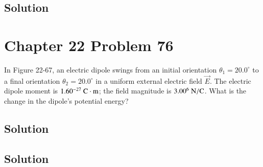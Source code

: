 \documentclass{article}
\newcommand{\m}{\text{m}}
\newcommand{\N}{\text{N}}
\newcommand{\C}{\text{C}}
\begin{document}
\subsection*{Solution}


\section*{Chapter 22 Problem 76}
In Figure 22-67, an electric dipole swings from an initial orientation $\theta_1 = 20.0^\circ$ to a final orientation $\theta_2 = 20.0^\circ$ in a uniform external electric field $\vec E$. The electric dipole moment is $1.60 \time 10^{-27}\ \C \cdot \m$; the field magnitude is $3.00 \time 10^6\ \N/\C$. What is the change in the dipole's potential energy?

\subsection*{Solution}


\subsection*{Solution}
\end{document}
